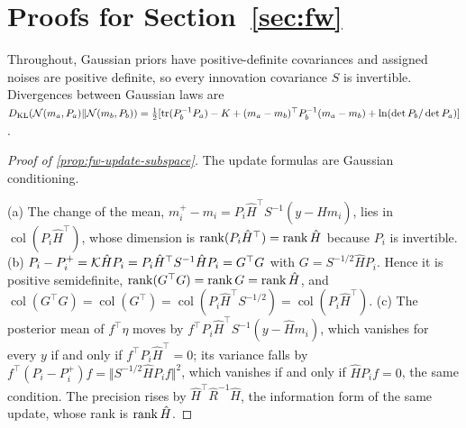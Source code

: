 \section{Proofs for \texorpdfstring{Section~\ref{sec:fw}}{the framework}}\label{app:fw}

Throughout, Gaussian priors have positive-definite covariances and assigned noises are positive definite, so every innovation covariance $S$ is invertible. Divergences between Gaussian laws are $D_{\mathrm{KL}}(\mathcal{N}(m_a,P_a)\Vert\mathcal{N}(m_b,P_b))=\tfrac12[\operatorname{tr}(P_b^{-1}P_a)-K+(m_a-m_b)^\top P_b^{-1}(m_a-m_b)+\ln(\det P_b/\det P_a)]$.

\begin{proof}[Proof of \cref{prop:fw-update-subspace}]
The update formulas are Gaussian conditioning.

(a) The change of the mean, $m_i^+-m_i=P_i\hat H^\top S^{-1}(y-\hat Hm_i)$, lies in $\operatorname{col}(P_i\hat H^\top)$, whose dimension is $\operatorname{rank}(P_i\hat H^\top)=\operatorname{rank}\hat H$ because $P_i$ is invertible. (b) $P_i-P_i^+=\mathcal{K}\hat HP_i=P_i\hat H^\top S^{-1}\hat HP_i=G^\top G$ with $G=S^{-1/2}\hat HP_i$. Hence it is positive semidefinite, $\operatorname{rank}(G^\top G)=\operatorname{rank} G=\operatorname{rank}\hat H$, and $\operatorname{col}(G^\top G)=\operatorname{col}(G^\top)=\operatorname{col}(P_i\hat H^\top S^{-1/2})=\operatorname{col}(P_i\hat H^\top)$. (c) The posterior mean of $f^\top\eta$ moves by $f^\top P_i\hat H^\top S^{-1}(y-\hat Hm_i)$, which vanishes for every $y$ if and only if $f^\top P_i\hat H^\top=0$; its variance falls by $f^\top(P_i-P_i^+)f=\Vert S^{-1/2}\hat HP_if\Vert^2$, which vanishes if and only if $\hat HP_if=0$, the same condition. The precision rises by $\hat H^\top\hat R^{-1}\hat H$, the information form of the same update, whose rank is $\operatorname{rank}\hat H$.
\end{proof}

